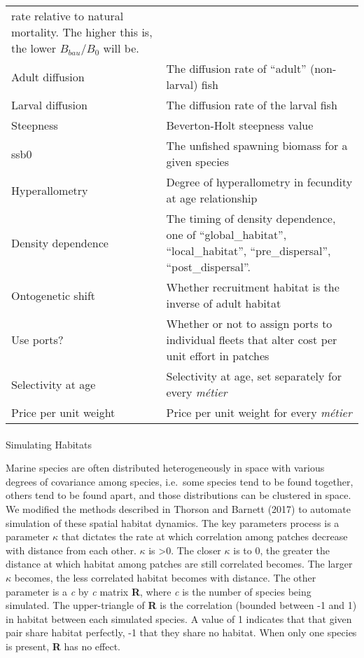 \documentclass[
  default,
  lineno,
  referee]{sn-jnl}
\makeatletter
\let\oldparagraph\paragraph
\renewcommand{\paragraph}{
    \@ifstar
      \xxxParagraphStar
      \xxxParagraphNoStar
  }
\newcommand{\xxxParagraphStar}[1]{\oldparagraph*{#1}\mbox{}}
\newcommand{\xxxParagraphNoStar}[1]{\oldparagraph{#1}\mbox{}}
\makeatother
\begin{document}
\begin{longtable}[]{@{}
  >{\raggedright\arraybackslash}p{}
  >{\raggedright\arraybackslash}p{}@{}}
rate relative to natural mortality. The higher this is, the lower
\(B_{bau}/B_0\) will be. \\
Adult diffusion & The diffusion rate of ``adult'' (non-larval) fish \\
Larval diffusion & The diffusion rate of the larval fish \\
Steepness & Beverton-Holt steepness value \\
ssb0 & The unfished spawning biomass for a given species \\
Hyperallometry & Degree of hyperallometry in fecundity at age
relationship \\
Density dependence & The timing of density dependence, one of
``global\_habitat'', ``local\_habitat'', ``pre\_dispersal'',
``post\_dispersal''. \\
Ontogenetic shift & Whether recruitment habitat is the inverse of adult
habitat \\
Use ports? & Whether or not to assign ports to individual fleets that
alter cost per unit effort in patches \\
Selectivity at age & Selectivity at age, set separately for every
\emph{métier} \\
Price per unit weight & Price per unit weight for every \emph{métier} \\
\end{longtable}

\paragraph{Simulating Habitats}\label{simulating-habitats}

Marine species are often distributed heterogeneously in space with
various degrees of covariance among species, i.e.~some species tend to
be found together, others tend to be found apart, and those
distributions can be clustered in space. We modified the methods
described in Thorson and Barnett (2017) to automate simulation of these
spatial habitat dynamics. The key parameters process is a parameter
\(\kappa\) that dictates the rate at which correlation among patches
decrease with distance from each other. \(\kappa\) is \textgreater0. The
closer \(\kappa\) is to 0, the greater the distance at which habitat
among patches are still correlated becomes. The larger \(\kappa\)
becomes, the less correlated habitat becomes with distance. The other
parameter is a \emph{c} by \emph{c} matrix \textbf{R}, where \emph{c} is
the number of species being simulated. The upper-triangle of \textbf{R}
is the correlation (bounded between -1 and 1) in habitat between each
simulated species. A value of 1 indicates that that given pair share
habitat perfectly, -1 that they share no habitat. When only one species
is present, \textbf{R} has no effect.
\end{document}
